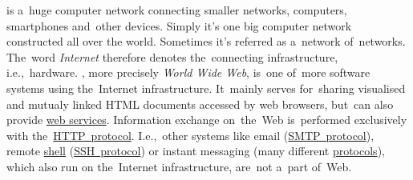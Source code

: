 \label{internetweb}
\begin{itemize}
     is a~huge computer network connecting smaller networks, computers, smartphones and~other devices.
            Simply it's one big computer network constructed all over the world.
            Sometimes it's referred as a~network of~networks.
            The~word \textit{Internet} therefore denotes the~connecting infrastructure, i.e.,~hardware.
    , more precisely \textit{World Wide Web}, is~one of~more software systems using the~Internet infrastructure.
            It~mainly serves for~sharing visualised and mutualy linked HTML documents accessed by web browsers, but~can also provide \hyperref[webserviceapplication]{web services}.
            Information exchange on~the~Web is~performed exclusively with the~\hyperref[http]{HTTP~protocol}.
            I.e.,~other systems like email (\hyperref[smtp]{SMTP~protocol}), remote \hyperref[shellcligui]{shell} (\hyperref[ssh]{SSH~protocol}) or instant messaging (many different \hyperref[protocolstandard]{protocols}), which also run on the~Internet infrastructure, are~not a~part of~Web.
\end{itemize}
